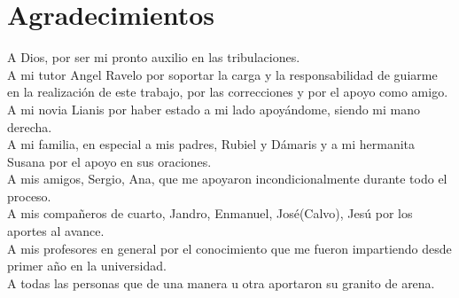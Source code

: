\section*{Agradecimientos}

A Dios, por ser mi pronto auxilio en las tribulaciones.\\
A mi tutor Angel Ravelo por soportar la carga y la responsabilidad de guiarme en la realización de este trabajo, por las correcciones y por el apoyo como amigo.\\
A mi novia Lianis por haber estado a mi lado apoyándome, siendo mi mano derecha.\\
A mi familia, en especial a mis padres, Rubiel y Dámaris y a mi hermanita Susana por el apoyo en sus oraciones.\\
A mis amigos, Sergio, Ana, que me apoyaron incondicionalmente durante todo el proceso.\\
A mis compañeros de cuarto, Jandro, Enmanuel, José(Calvo), Jesú por los aportes al avance.\\
A mis profesores en general por el conocimiento que me fueron impartiendo desde primer año en la universidad.\\
A todas las personas que de una manera u otra aportaron su granito de arena.\\